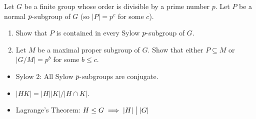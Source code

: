 Let \(G\) be a finite group whose order is divisible by a prime number
\(p\). Let \(P\) be a normal \(p{\hbox{-}}\)subgroup of \(G\) (so
\({\left\lvert {P} \right\rvert} = p^c\) for some \(c\)).

\begin{enumerate}
\def\labelenumi{\alph{enumi}.}
\item
  Show that \(P\) is contained in every Sylow \(p{\hbox{-}}\)subgroup of
  \(G\).
\item
  Let \(M\) be a maximal proper subgroup of \(G\). Show that either
  \(P \subseteq M\) or \(|G/M | = p^b\) for some \(b \leq c\).
\end{enumerate}

\begin{concept}

\envlist

\begin{itemize}
\tightlist
\item
  Sylow 2: All Sylow \(p{\hbox{-}}\)subgroups are conjugate.
\item
  \({\left\lvert {HK} \right\rvert} = {\left\lvert {H} \right\rvert} {\left\lvert {K} \right\rvert} / {\left\lvert {H\cap K} \right\rvert}\).
\item
  Lagrange's Theorem:
  \(H\leq G \implies {\left\lvert {H} \right\rvert} \bigm|{\left\lvert {G} \right\rvert}\)
\end{itemize}

\end{concept}

